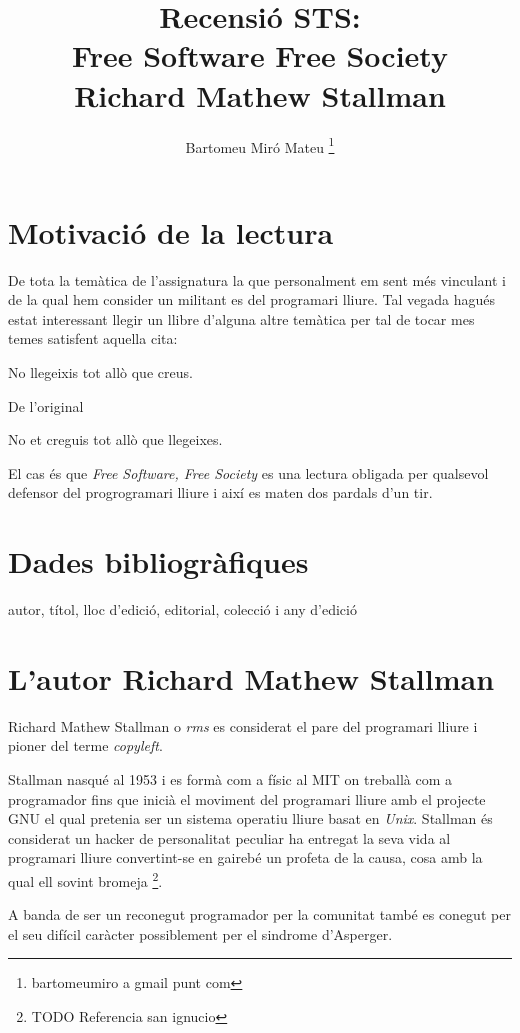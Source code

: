 \documentclass[a4paper,11pt]{scrartcl}
\title{Recensió STS: \\ \huge{Free Software Free Society} \\ \normalsize{Richard Mathew Stallman}}
\author{Bartomeu Miró Mateu \thanks{bartomeumiro a gmail punt com} \\}
\begin{document}
  \maketitle

  \newpage
  \setcounter{page}{2}
  \tableofcontents
  \newpage

  \section{Motivació de la lectura}
De tota la temàtica de l'assignatura la que personalment em sent més vinculant i de
la qual hem consider un militant es del programari lliure. Tal vegada hagués
estat interessant llegir un llibre d'alguna altre temàtica per tal de tocar
mes temes satisfent aquella cita:
  
  No llegeixis tot allò que creus.
  
De l'original

  No et creguis tot allò que llegeixes.
  
El cas és que \emph{Free Software, Free Society} es una lectura obligada
per qualsevol defensor del progrogramari lliure i així
es maten dos pardals d'un tir.

  \section{Dades bibliogràfiques}


autor, títol, lloc d'edició, editorial, colecció i any d'edició

  \section{L'autor Richard Mathew Stallman}
  
Richard Mathew Stallman o \emph{rms} es considerat el pare del programari lliure i
pioner del terme \emph{copyleft}.

Stallman nasqué al 1953 i es formà com a físic al MIT on treballà com a programador
fins que inicià el moviment del programari lliure amb el projecte GNU el qual
pretenia ser un sistema operatiu lliure basat en \emph{Unix}. 
Stallman és considerat un hacker de personalitat peculiar
ha entregat la seva vida al programari lliure convertint-se en gairebé un profeta de la causa,
cosa amb la qual ell sovint bromeja \footnote{TODO Referencia san ignucio}.

A banda de ser un reconegut programador per la comunitat també es conegut per el seu
difícil caràcter possiblement per el sindrome d'Asperger.
\end{document}
